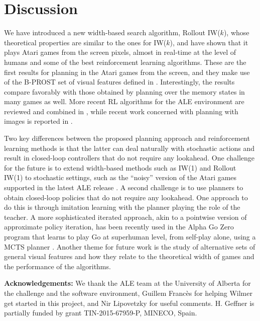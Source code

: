 \documentclass[letterpaper]{article}
\begin{document}
\section{Discussion}

We have introduced a new width-based search algorithm, Rollout IW($k$), whose
theoretical properties are similar to the ones for IW($k$), and have shown that
it plays Atari games from the screen pixels, almost in real-time at the level
of humans and some of the best reinforcement learning algorithms.
These are the first results for planning in the Atari games from the screen, and
they make use of the B-PROST set of visual features defined in \cite{shallow}.
Interestingly, the results compare favorably with those obtained by planning over
the memory states in many games as well. More recent RL algorithms for the ALE
environment are reviewed and combined in \cite{silver:rainbow}, while recent work
concerned with planning with images is reported in \cite{fukunaga:planning-images}.



Two key differences between the proposed planning approach and reinforcement learning
methods is that the latter can deal naturally with stochastic actions and result in
closed-loop controllers that do not require any lookahead.
One challenge for the future is to extend width-based methods such as IW(1) and Rollout IW(1)
to stochastic settings, such as the ``noisy'' version of the Atari games supported in the
latest ALE release \cite{machado:ale}. A second challenge is to use planners to
obtain closed-loop policies that do not require any lookahead. One approach to do this
is through imitation learning with the planner playing the role of the teacher.
A more sophisticated iterated approach, akin to a pointwise version of approximate policy iteration,
has been recently used in the Alpha Go Zero program that learns to play Go at superhuman level,
from self-play alone, using a MCTS planner \cite{alpha-zero-go}.
Another theme for future work is the study of alternative sets of general visual
features and how they relate to the theoretical width of games and the performance
of the algorithms.


\medskip
\noindent\textbf{Acknowledgements:}
We thank the ALE team at the University of Alberta for the challenge and the software environment,
Guillem Franc\`es for helping Wilmer get started in this project, and
Nir Lipovetzky for useful comments.
H. Geffner is partially funded by grant TIN-2015-67959-P, MINECO, Spain.
\end{document}
